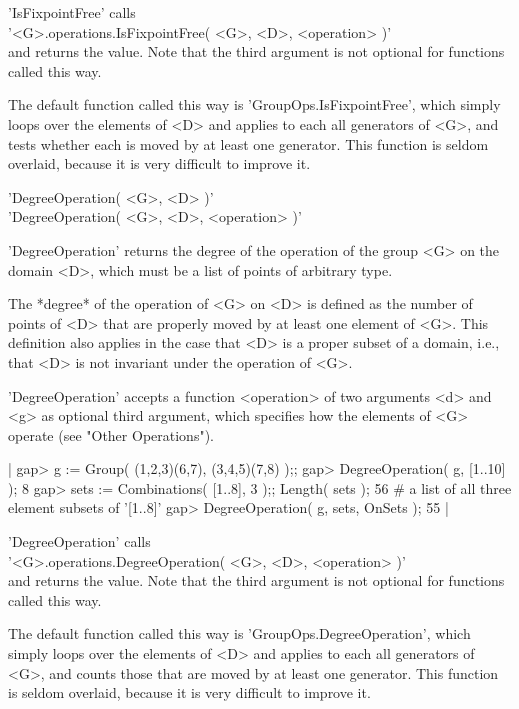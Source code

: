 'IsFixpointFree' calls \\
'<G>.operations.IsFixpointFree( <G>, <D>, <operation> )' \\
and returns the value.  Note that the third  argument is not optional for
functions called this way.

The default function called this  way is 'GroupOps.IsFixpointFree', which
simply loops over the elements of <D> and applies to each  all generators
of <G>, and tests whether each is moved by at  least one generator.  This
function is seldom overlaid, because it is very difficult to improve it.


'DegreeOperation( <G>, <D> )' \\
'DegreeOperation( <G>, <D>, <operation> )'

'DegreeOperation' returns the degree of the operation of the group <G> on
the domain <D>, which must be a list of points of arbitrary type.

The *degree* of the operation of <G>  on <D> is defined  as the number of
points  of <D> that  are properly moved by at   least one element of <G>.
This definition also applies in the case that <D> is a proper subset of a
domain, i.e., that <D> is not invariant under the operation of <G>.

'DegreeOperation' accepts a function <operation> of two arguments <d> and
<g> as optional third  argument, which specifies  how the elements of <G>
operate (see "Other Operations").

|    gap> g := Group( (1,2,3)(6,7), (3,4,5)(7,8) );;
    gap> DegreeOperation( g, [1..10] );
    8
    gap> sets := Combinations( [1..8], 3 );;  Length( sets );
    56   # a list of all three element subsets of '[1..8]'
    gap> DegreeOperation( g, sets, OnSets );
    55 |

'DegreeOperation' calls \\
'<G>.operations.DegreeOperation( <G>, <D>, <operation> )' \\
and returns the value.  Note that the third argument is  not optional for
functions called this way.

The default function called this way is 'GroupOps.DegreeOperation', which
simply loops over the elements of <D> and  applies to each all generators
of <G>, and counts those that are  moved by at least one generator.  This
function is seldom overlaid, because it is very difficult to improve it.

